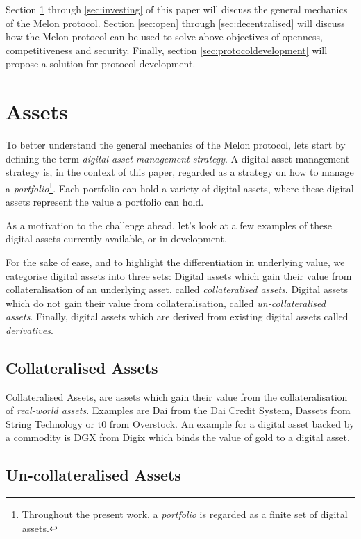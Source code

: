 \documentclass[9pt,oneside]{amsart}
\theoremstyle{plain}
\begin{document}
\begin{multicols}{2}
Section \ref{sec:assets} through \ref{sec:investing} of this paper will discuss the general mechanics of the Melon protocol.
Section \ref{sec:open} through \ref{sec:decentralised} will discuss how the Melon protocol can be used to solve above objectives of openness, competitiveness and security.
Finally, section \ref{sec:protocoldevelopment} will propose a solution for protocol development.

\section{Assets}\label{sec:assets}

To better understand the general mechanics of the Melon protocol, lets start by defining the term \textit{digital asset management strategy}. A digital asset management strategy is, in the context of this paper, regarded as a strategy on how to manage a \textit{portfolio}\footnote{Throughout the present work, a \textit{portfolio} is regarded as a finite set of digital assets.}.
Each portfolio can hold a variety of digital assets, where these digital assets represent the value a portfolio can hold.

As a motivation to the challenge ahead, let's look at a few examples of these digital assets currently available, or in development.

For the sake of ease, and to highlight the differentiation in underlying value, we categorise digital assets into three sets: Digital assets which gain their value from collateralisation of an underlying asset, called \textit{collateralised assets}. Digital assets which do not gain their value from collateralisation, called \textit{un-collateralised assets}. Finally, digital assets which are derived from existing digital assets called \textit{derivatives}.

\subsection{Collateralised Assets}\label{sub:altcoins}

Collateralised Assets, are assets which gain their value from the collateralisation of \textit{real-world assets}.
Examples are Dai from the Dai Credit System\cite{makerdao}, Dassets\cite{string:technology} from String Technology or t0\cite{t0} from Overstock. An example for a digital asset backed by a commodity is DGX from Digix\cite{digix} which binds the value of gold to a digital asset.


\subsection{Un-collateralised Assets}\label{sub:coins}


\end{multicols}
\end{document}
